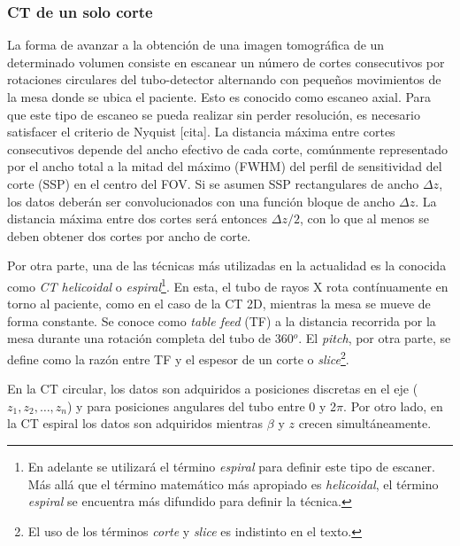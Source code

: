 \subsubsection{CT de un solo corte}

La forma de avanzar a la obtenci{\'o}n de una imagen tomogr{\'a}fica de un
determinado volumen consiste en escanear un n{\'u}mero de cortes consecutivos
por rotaciones circulares del tubo-detector alternando con peque{\~n}os
movimientos de la mesa donde se ubica el paciente. Esto es conocido como
escaneo axial. Para que este tipo de escaneo se pueda realizar sin perder
resoluci{\'o}n, es necesario satisfacer el criterio de Nyquist [cita]. La
distancia m{\'a}xima entre cortes consecutivos depende del ancho efectivo de
cada corte, com{\'u}nmente representado por el ancho total a la mitad del
m{\'a}ximo (FWHM) del perfil de sensitividad del corte (SSP) en el centro del
FOV. Si se asumen SSP rectangulares de ancho $\Delta z$, los datos deber{\'a}n
ser convolucionados con una funci{\'o}n bloque de ancho $\Delta z$. La
distancia m{\'a}xima entre dos cortes ser{\'a} entonces $\Delta z / 2$, con lo
que al menos se deben obtener dos cortes por ancho de corte.

Por otra parte, una de las t{\'e}cnicas m{\'a}s utilizadas en la actualidad es
la conocida como {\emph{CT helicoidal}} o {\emph{espiral}}\footnote{En
adelante se utilizar{\'a} el t{\'e}rmino {\emph{espiral}} para definir este
tipo de escaner. M{\'a}s all{\'a} que el t{\'e}rmino matem{\'a}tico m{\'a}s
apropiado es {\emph{helicoidal}}, el t{\'e}rmino {\emph{espiral}} se encuentra
m{\'a}s difundido para definir la t{\'e}cnica.}. En esta, el tubo de rayos X
rota cont{\'i}nuamente en torno al paciente, como en el caso de la CT 2D,
mientras la mesa se mueve de forma constante. Se conoce como {\emph{table
feed}} (TF) a la distancia recorrida por la mesa durante una rotaci{\'o}n
completa del tubo de 360$^{o}$. El {\emph{pitch}}, por otra parte, se
define como la raz{\'o}n entre TF y el espesor de un corte o
{\emph{slice}}\footnote{El uso de los t{\'e}rminos {\emph{corte}} y
{\emph{slice}} es indistinto en el texto.}.

En la CT circular, los datos son adquiridos a posiciones discretas en el eje
($z_1, z_2, \ldots, z_n$) y para posiciones
angulares del tubo entre 0 y 2$\pi$. Por otro lado, en la CT espiral los datos
son adquiridos mientras $\beta$ y $z$ crecen simult{\'a}neamente.

